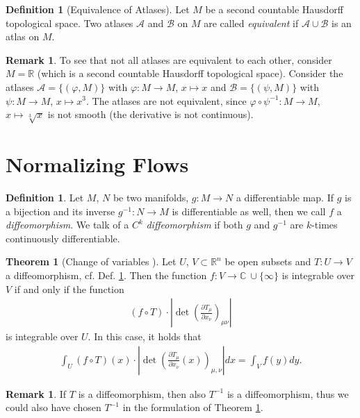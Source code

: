 \documentclass[12pt, a4paper]{article}
\numberwithin{equation}{section}
\theoremstyle{definition}
\theoremstyle{definition}
\newtheorem{defn}[thm]{Definition} %
\newtheorem{remark}[thm]{Remark} %
\newtheorem{theorem}[thm]{Theorem}
\begin{document}
	\begin{defn}[Equivalence of Atlases]
		Let $M$ be a second countable Hausdorff topological space. Two atlases $\mathcal A$ and $\mathcal B$ on $M$ are called \textit{equivalent} if $\mathcal A\cup \mathcal B$ is an atlas on $M$.  
	\end{defn}

	\begin{remark}
		To see that not all atlases are equivalent to each other, consider $M = \mathbb R$ (which is a second countable Hausdorff topological space). Consider the atlases $\mathcal A = \{ (\varphi, M) \}$ with $\varphi: M\rightarrow M$, $x\mapsto x$ and $\mathcal B = \{(\psi, M)\}$ with $\psi: M\rightarrow M$, $x\mapsto x^3$. The atlases are not equivalent, since $\varphi\circ \psi^{-1}: M \rightarrow M$, $x\mapsto \sqrt[3]{x}$ is not smooth (the derivative is not continuous). 
	\end{remark}
	
	\newpage 
	\section{Normalizing Flows}
	\begin{defn}\label{defn-diffeomorphism}
		Let $M$, $N$ be two manifolds, $g: M\rightarrow N$ a differentiable map. If $g$ is a bijection and its inverse $g^{-1}: N\rightarrow M$ is differentiable as well, then we call $f$ a \textit{diffeomorphism}. We talk of a $C^k$ \textit{diffeomorphism} if both $g$ and $g^{-1}$ are $k$-times continuously differentiable. 
	\end{defn}
	
	\begin{theorem}[Change of variables \cite{MfPIII}]\label{change-of-variables}
		Let $U$, $V\subset\mathbb{R}^n$ be open subsets and $T: U\rightarrow V$ a diffeomorphism, cf. Def.  \ref{defn-diffeomorphism}. Then the function $f: V\rightarrow \mathbb{C} \ \cup \{\infty\}$ is integrable over $V$ if and only if the function 
		\begin{align}
			\left(f\circ T\right) \cdot \left\vert \det \left( \frac{\partial T_{\mu}}{\partial x_{\nu}} \right)_{\mu\nu} \right\vert 
		\end{align}
		is integrable over $U$. In this case, it holds that 
		\begin{align}\label{change-of-variables-formula}
			\int_{U} \left(f\circ T\right)(x) \cdot \left\vert \det\left(\frac{\partial T_{\mu}}{\partial x_{\nu}}(x)\right)_{\mu, \nu} \right\vert dx = \int_{V} f(y)dy. 
		\end{align}
	\end{theorem}
	\begin{remark}\label{diffeomorphism-inverse}
		If $T$ is a diffeomorphism, then also $T^{-1}$ is a diffeomorphism, thus we could also have chosen $T^{-1}$ in the formulation of Theorem \ref{change-of-variables}.
	\end{remark}
	
\end{document}
